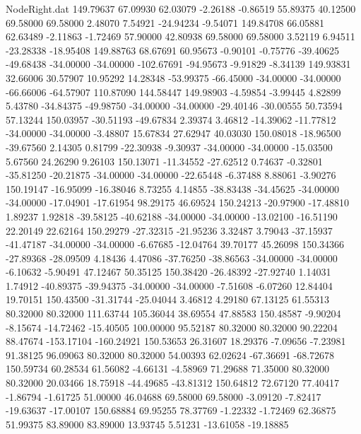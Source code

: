 \begin{filecontents}{NodeRight.dat}
 149.79637   67.09930   62.03079    -2.26188   -0.86519   55.89375   40.12500   69.58000   69.58000    2.48070    7.54921  -24.94234   -9.54071
 149.84708   66.05881   62.63489    -2.11863   -1.72469   57.90000   42.80938   69.58000   69.58000    3.52119    6.94511  -23.28338  -18.95408
 149.88763   68.67691   60.95673    -0.90101   -0.75776  -39.40625  -49.68438  -34.00000  -34.00000 -102.67691  -94.95673   -9.91829   -8.34139
 149.93831   32.66006   30.57907    10.95292   14.28348  -53.99375  -66.45000  -34.00000  -34.00000  -66.66006  -64.57907  110.87090  144.58447
 149.98903   -4.59854   -3.99445     4.82899    5.43780  -34.84375  -49.98750  -34.00000  -34.00000  -29.40146  -30.00555   50.73594   57.13244
 150.03957  -30.51193  -49.67834     2.39374    3.46812  -14.39062  -11.77812  -34.00000  -34.00000   -3.48807   15.67834   27.62947   40.03030
 150.08018  -18.96500  -39.67560     2.14305    0.81799  -22.30938   -9.30937  -34.00000  -34.00000  -15.03500    5.67560   24.26290    9.26103
 150.13071  -11.34552  -27.62512     0.74637   -0.32801  -35.81250  -20.21875  -34.00000  -34.00000  -22.65448   -6.37488    8.88061   -3.90276
 150.19147  -16.95099  -16.38046     8.73255    4.14855  -38.83438  -34.45625  -34.00000  -34.00000  -17.04901  -17.61954   98.29175   46.69524
 150.24213  -20.97900  -17.48810     1.89237    1.92818  -39.58125  -40.62188  -34.00000  -34.00000  -13.02100  -16.51190   22.20149   22.62164
 150.29279  -27.32315  -21.95236     3.32487    3.79043  -37.15937  -41.47187  -34.00000  -34.00000   -6.67685  -12.04764   39.70177   45.26098
 150.34366  -27.89368  -28.09509     4.18436    4.47086  -37.76250  -38.86563  -34.00000  -34.00000   -6.10632   -5.90491   47.12467   50.35125
 150.38420  -26.48392  -27.92740     1.14031    1.74912  -40.89375  -39.94375  -34.00000  -34.00000   -7.51608   -6.07260   12.84404   19.70151
 150.43500  -31.31744  -25.04044     3.46812    4.29180   67.13125   61.55313   80.32000   80.32000  111.63744  105.36044   38.69554   47.88583
 150.48587   -9.90204   -8.15674   -14.72462  -15.40505  100.00000   95.52187   80.32000   80.32000   90.22204   88.47674 -153.17104 -160.24921
 150.53653   26.31607   18.29376    -7.09656   -7.23981   91.38125   96.09063   80.32000   80.32000   54.00393   62.02624  -67.36691  -68.72678
 150.59734   60.28534   61.56082    -4.66131   -4.58969   71.29688   71.35000   80.32000   80.32000   20.03466   18.75918  -44.49685  -43.81312
 150.64812   72.67120   77.40417    -1.86794   -1.61725   51.00000   46.04688   69.58000   69.58000   -3.09120   -7.82417  -19.63637  -17.00107
 150.68884   69.95255   78.37769    -1.22332   -1.72469   62.36875   51.99375   83.89000   83.89000   13.93745    5.51231  -13.61058  -19.18885

\end{filecontents}
